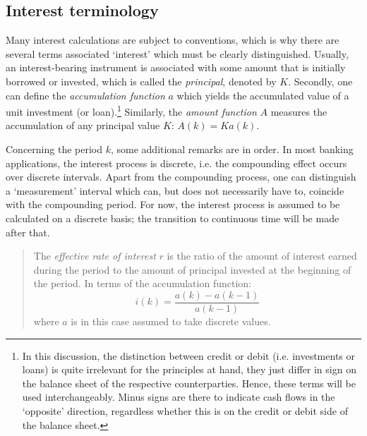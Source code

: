 \subsection{Interest terminology}
Many interest calculations are subject to conventions, which is why there are several terms associated `interest' which must be clearly distinguished. Usually, an interest-bearing instrument is associated with some amount that is initially borrowed or invested, which is called the \emph{principal}, denoted by $K$. Secondly, one can define  the \emph{accumulation function} $a$ which yields the accumulated value of a unit investment (or loan).\footnote{In this discussion, the distinction between credit or debit (i.e. investments or loans) is quite irrelevant for the principles at hand, they just differ in sign on the balance sheet of the respective counterparties. Hence, these terms will be used interchangeably. Minus signs are there to indicate cash flows in the `opposite' direction, regardless whether this is on the credit or debit side of the balance sheet.}
Similarly, the \emph{amount function} $A$ measures the accumulation of any principal value $K$: $A(k) = Ka(k)$. \cite{Kellison1991}

Concerning the period $k$, some additional remarks are in order. In most banking applications, the interest process is discrete, i.e. the compounding effect occurs over discrete intervals. Apart from the compounding process, one can distinguish a `measurement' interval which can, but does not necessarily have to, coincide with the compounding period. For now, the interest process is assumed to be calculated on a discrete basis; the transition to continuous time will be made after that.

\begin{quote}
    The \emph{effective rate of interest} $r$ is the ratio of the amount of interest earned during the period to the amount of principal invested at the beginning of the period. In terms of the accumulation function:
     \begin{equation}
         i(k) = \frac{a(k) - a(k-1)}{a(k-1)}
         \label{eq:effective_interest}
     \end{equation}
     where $a$ is in this case assumed to take discrete values.
\end{quote}

\begin{quote}
    
\end{quote}

